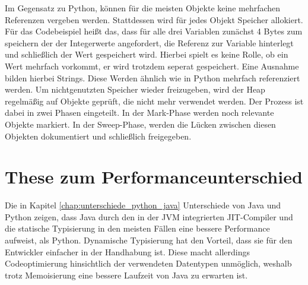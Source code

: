 Im Gegensatz zu Python, können für die meisten Objekte keine mehrfachen Referenzen vergeben werden. Stattdessen wird für jedes 
Objekt Speicher allokiert. Für das Codebeispiel heißt das, dass für alle drei Variablen zunächst 4 Bytes zum speichern der 
der Integerwerte angefordert, die Referenz zur Variable hinterlegt und schließlich der Wert gespeichert wird. Hierbei spielt 
es keine Rolle, ob ein Wert mehrfach vorkommt, er wird trotzdem seperat gespeichert. Eine Ausnahme bilden hierbei Strings. 
Diese Werden ähnlich wie in Python mehrfach referenziert werden. Um nichtgenutzten Speicher wieder freizugeben, wird der Heap 
regelmäßig auf Objekte geprüft, die nicht mehr verwendet werden. Der Prozess ist dabei in zwei Phasen eingeteilt. In der Mark-Phase 
werden noch relevante Objekte markiert. In der Sweep-Phase, werden die Lücken zwischen diesen Objekten dokumentiert und schließlich 
freigegeben.\autocite[Vgl.][]{OracleGC.2021}

\section{These zum Performanceunterschied}

Die in Kapitel \ref{chap:unterschiede_python_java} Unterschiede von Java und Python zeigen, dass Java durch den in der JVM integrierten 
JIT-Compiler und die statische Typisierung in den meisten Fällen eine bessere Performance aufweist, als Python. 
Dynamische Typisierung hat den Vorteil, dass sie für den Entwickler einfacher in der Handhabung ist. Diese macht allerdings 
Codeoptimierung hinsichtlich der verwendeten Datentypen unmöglich, weshalb trotz Memoisierung eine bessere Laufzeit von 
Java zu erwarten ist.